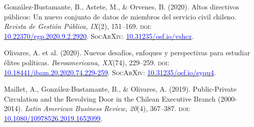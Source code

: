 \begin{publications}
\begin{benumerate}{10}
\item{\small González-Bustamante, B., Astete, M., \& Orvenes, B. (2020). Altos directivos públicos: Un nuevo conjunto de datos de miembros del servicio civil chileno. {\itshape Revista de Gestión Pública, IX}(2), 151--169. {\scshape doi}: \\ \href{https://doi.org/10.22370/rgp.2020.9.2.2920}{\textcolor{blue}{10.22370/rgp.2020.9.2.2920}}. {\scshape \footnotesize SocArXiv:} \href{https://doi.org/10.31235/osf.io/vshcz}{\textcolor{blue}{10.31235/osf.io/vshcz}}.}\vspace{1mm}


\item{\small Olivares, A. et al. (2020). Nuevos desafíos, enfoques y perspectivas para estudiar élites políticas. {\itshape Iberoamericana, XX}(74), 229--259. {\scshape doi}: \href{https://doi.org/10.18441/ibam.20.2020.74.229-259}{\textcolor{blue}{10.18441/ibam.20.2020.74.229-259}}. {\scshape \footnotesize SocArXiv:} \href{https://doi.org/10.31235/osf.io/syqu4}{\textcolor{blue}{10.31235/osf.io/syqu4}}.}\vspace{1mm}

\item{\small Maillet, A., González-Bustamante, B., \& Olivares, A. (2019). Public-Private Circulation and the Revolving Door in the Chilean Executive Branch (2000-2014). {\itshape Latin American Business Review, 20}(4), 367--387. {\scshape doi:} \href{https://doi.org/10.1080/10978526.2019.1652099}{\textcolor{blue}{10.1080/10978526.2019.1652099}}.}\vspace{1mm}



\end{benumerate}
\end{publications}
